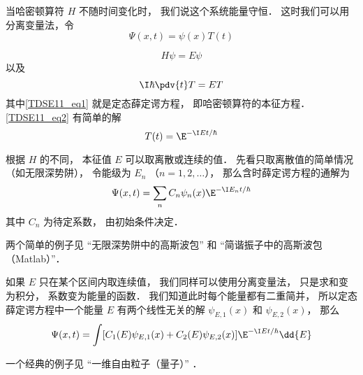 
\begin{issues}
\issueDraft
\end{issues}


当哈密顿算符 $H$ 不随时间变化时， 我们说这个系统能量守恒． 这时我们可以用分离变量法，令
\begin{equation}
\Psi(x, t) = \psi(x) T(t)
\end{equation}
 
\begin{equation}\label{TDSE11_eq1}
H\psi = E\psi
\end{equation}
以及
\begin{equation}\label{TDSE11_eq2}
\I \hbar\pdv{t}T = ET
\end{equation}
其中\autoref{TDSE11_eq1} 就是定态薛定谔方程， 即哈密顿算符的本征方程． \autoref{TDSE11_eq2} 有简单的解
\begin{equation}
T(t) = \E^{-\I E t/\hbar}
\end{equation}

根据 $H$ 的不同， 本征值 $E$ 可以取离散或连续的值． 先看只取离散值的简单情况（如无限深势阱）， 令能级为 $E_n$ （$n = 1, 2, \dots$）， 那么含时薛定谔方程的通解为
\begin{equation}\label{TDSE11_eq5}
\Psi(x, t) = \sum_n C_n \psi_n(x) \E^{-\I E_n t/\hbar}
\end{equation}
其中 $C_n$ 为待定系数， 由初始条件决定．

两个简单的例子见 “无限深势阱中的高斯波包” 和 “简谐振子中的高斯波包（Matlab）”．

如果 $E$ 只在某个区间内取连续值， 我们同样可以使用分离变量法， 只是求和变为积分， 系数变为能量的函数． 我们知道此时每个能量都有二重简并， 所以定态薛定谔方程中一个能量 $E$ 有两个线性无关的解 $\psi_{E,1}(x)$ 和 $\psi_{E,2}(x)$， 那么
\begin{equation}\label{TDSE11_eq4}
\Psi(x, t) = \int [C_1(E) \psi_{E,1}(x) + C_2(E) \psi_{E,2}(x)] \E^{-\I E t/\hbar} \dd{E}
\end{equation}

一个经典的例子见 “一维自由粒子（量子）” ．

